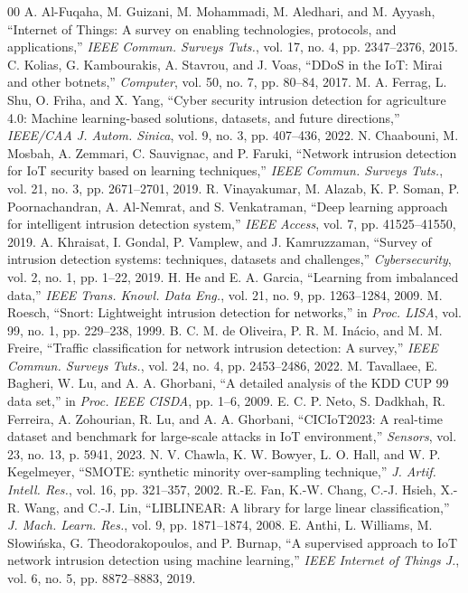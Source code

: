 \documentclass[conference]{IEEEtran}
\begin{document}
\begin{thebibliography}{00}
 A. Al-Fuqaha, M. Guizani, M. Mohammadi, M. Aledhari, and M. Ayyash, ``Internet of Things: A survey on enabling technologies, protocols, and applications,'' \textit{IEEE Commun. Surveys Tuts.}, vol. 17, no. 4, pp. 2347--2376, 2015.
 C. Kolias, G. Kambourakis, A. Stavrou, and J. Voas, ``DDoS in the IoT: Mirai and other botnets,'' \textit{Computer}, vol. 50, no. 7, pp. 80--84, 2017.
 M. A. Ferrag, L. Shu, O. Friha, and X. Yang, ``Cyber security intrusion detection for agriculture 4.0: Machine learning-based solutions, datasets, and future directions,'' \textit{IEEE/CAA J. Autom. Sinica}, vol. 9, no. 3, pp. 407--436, 2022.
 N. Chaabouni, M. Mosbah, A. Zemmari, C. Sauvignac, and P. Faruki, ``Network intrusion detection for IoT security based on learning techniques,'' \textit{IEEE Commun. Surveys Tuts.}, vol. 21, no. 3, pp. 2671--2701, 2019.
 R. Vinayakumar, M. Alazab, K. P. Soman, P. Poornachandran, A. Al-Nemrat, and S. Venkatraman, ``Deep learning approach for intelligent intrusion detection system,'' \textit{IEEE Access}, vol. 7, pp. 41525--41550, 2019.
 A. Khraisat, I. Gondal, P. Vamplew, and J. Kamruzzaman, ``Survey of intrusion detection systems: techniques, datasets and challenges,'' \textit{Cybersecurity}, vol. 2, no. 1, pp. 1--22, 2019.
 H. He and E. A. Garcia, ``Learning from imbalanced data,'' \textit{IEEE Trans. Knowl. Data Eng.}, vol. 21, no. 9, pp. 1263--1284, 2009.
 M. Roesch, ``Snort: Lightweight intrusion detection for networks,'' in \textit{Proc. LISA}, vol. 99, no. 1, pp. 229--238, 1999.
 B. C. M. de Oliveira, P. R. M. In\'acio, and M. M. Freire, ``Traffic classification for network intrusion detection: A survey,'' \textit{IEEE Commun. Surveys Tuts.}, vol. 24, no. 4, pp. 2453--2486, 2022.
 M. Tavallaee, E. Bagheri, W. Lu, and A. A. Ghorbani, ``A detailed analysis of the KDD CUP 99 data set,'' in \textit{Proc. IEEE CISDA}, pp. 1--6, 2009.
 E. C. P. Neto, S. Dadkhah, R. Ferreira, A. Zohourian, R. Lu, and A. A. Ghorbani, ``CICIoT2023: A real-time dataset and benchmark for large-scale attacks in IoT environment,'' \textit{Sensors}, vol. 23, no. 13, p. 5941, 2023.
 N. V. Chawla, K. W. Bowyer, L. O. Hall, and W. P. Kegelmeyer, ``SMOTE: synthetic minority over-sampling technique,'' \textit{J. Artif. Intell. Res.}, vol. 16, pp. 321--357, 2002.
 R.-E. Fan, K.-W. Chang, C.-J. Hsieh, X.-R. Wang, and C.-J. Lin, ``LIBLINEAR: A library for large linear classification,'' \textit{J. Mach. Learn. Res.}, vol. 9, pp. 1871--1874, 2008.
 E. Anthi, L. Williams, M. S{\l}owi{\'n}ska, G. Theodorakopoulos, and P. Burnap, ``A supervised approach to IoT network intrusion detection using machine learning,'' \textit{IEEE Internet of Things J.}, vol. 6, no. 5, pp. 8872--8883, 2019.
\end{thebibliography}
\end{document}
